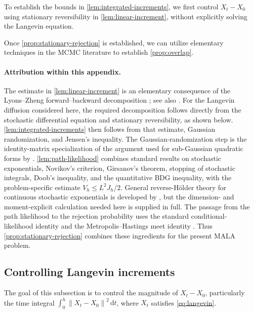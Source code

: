 \documentclass[11pt]{article}
\newcommand{\norm}[1]{\left\lVert #1\right\rVert}
\newcommand{\1}{\mathbf 1}
\newcommand{\df}{\mathrm{d}}
\begin{document}
	To establish the bounds in \cref{lem:integrated-increments}, we first
	control \(X_t-X_0\) using stationary reversibility in
	\cref{lem:linear-increment}, without explicitly solving the
	Langevin equation.
	
	
	Once \cref{prop:stationary-rejection} is established, we can utilize elementary techniques in the MCMC literature \citep[see, e.g.,][proof of Theorem~3]{WuSchmidlerChen2022} to establish \cref{prop:overlap}.
	
	\paragraph{Attribution within this appendix.}
	The estimate in \cref{lem:linear-increment} is an elementary consequence
	of the Lyons--Zheng forward--backward decomposition
	\citep[Section~1, especially equation~(1.7)]{LyonsZheng1988}; see also
	\citet[Theorem~5.7.1]{FukushimaOshimaTakeda2011}.
	For the Langevin diffusion considered here, the required decomposition
	follows directly from the stochastic differential equation and stationary
	reversibility, as shown below.
	\cref{lem:integrated-increments} then follows from that estimate,
	Gaussian randomization, and Jensen's inequality.
	The Gaussian-randomization step is the identity-matrix specialization
	of the argument used for sub-Gaussian quadratic forms by
	\citet[Theorem~1 and Remark~2]{HsuKakadeZhang2012}.
	\cref{lem:path-likelihood} combines standard results on stochastic
	exponentials, Novikov's criterion, Girsanov's theorem, stopping of
	stochastic integrals, Doob's inequality, and the quantitative BDG
	inequality, with the problem-specific estimate \(V_h\leq L^2J_h/2\).
	General reverse-H\"older theory for continuous stochastic exponentials
	is developed by \citet{Kazamaki1994}, but the dimension- and
	moment-explicit calculation needed here is supplied in full.
	The passage from the path likelihood to the rejection probability uses
	the standard conditional-likelihood identity and the
	Metropolis--Hastings meet identity
	\citep{Kallenberg2021,Tierney1998,BilleraDiaconis2001}.
	Thus \cref{prop:stationary-rejection} combines these ingredients for
	the present MALA problem.
	
	\subsection{Controlling Langevin increments}
	
	The goal of this subsection is to control the magnitude of \(X_t-X_0\),
	particularly the time integral
	\(\int_0^h\norm{X_t-X_0}^2\,\df t\), where \(X_t\) satisfies
	\eqref{eq:langevin}.
	
\end{document}
